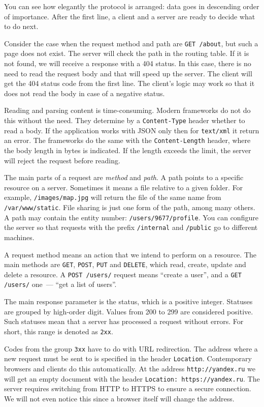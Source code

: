 You can see how elegantly the protocol is arranged: data goes in descending order of importance. After the first line, a client and a server are ready to decide what to do next.


Consider the case when the request method and path are \verb|GET /about|, but such a page does not exist. The server will check the path in the routing table. If it is not found, we will receive a response with a 404 status. In this case, there is no need to read the request body and that will speed up the server. The client will get the 404 status code from the first line. The client's logic may work so that it does not read the body in case of a negative status.

Reading and parsing content is time-consuming. Modern frameworks do not do this without the need. They determine by a \verb|Content-Type| header whether to read a body. If the application works with JSON only then for \verb|text/xml| it return an error. The frameworks do the same with the \verb|Content-Length| header, where the body length in bytes is indicated. If the length exceeds the limit, the server will reject the request before reading.

The main parts of a request are \emph{method} and \emph{path}. A path points to a specific resource on a server. Sometimes it means a file relative to a given folder. For example, \verb|/images/map.jpg| will return the file of the same name from \verb|/var/www/static|. File sharing is just one form of the path, among many others. A path may contain the entity number: \verb|/users/9677/profile|. You can configure the server so that requests with the prefix \verb|/internal| and \verb|/public| go to different machines.

A request method means an action that we intend to perform on a resource. The main methods are \verb|GET|, \verb|POST|, \verb|PUT| and \verb|DELETE|, which read, create, update and delete a resource. A \verb|POST /users/| request  means ``create a user'', and a \verb|GET /users/| one~--- ``get a list of users''.

The main response parameter is the status, which is a positive integer. Statuses are grouped by high-order digit. Values from 200 to 299 are considered positive. Such statuses mean that a server has processed a request without errors. For short, this range is denoted as \verb|2хх|.

Codes from the group \verb|3хх| have to do with URL redirection. The address where a new request must be sent to is specified in the header \verb|Location|. Contemporary browsers and clients do this automatically. At the address \verb|http://yandex.ru| we will get an empty document with the header \verb|Location: https://yandex.ru|. The server requires switching from HTTP to HTTPS to ensure a secure connection. We will not even notice this since a browser itself will change the address.

